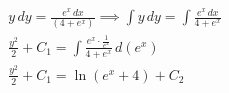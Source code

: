 \documentclass[../rgr_2.tex]{subfiles}
\begin{document}
\Solution

\begin{align}
	y\,dy=\frac{e^x\,dx}{(4+e^x)} \implies
	\int y\,dy=\int \frac{e^x\,dx}{4+e^x} \\
	\frac{y^2}{2}+C_1=\int \frac{e^x\cdot\frac{1}{e^x}}{4+e^x}\,d(e^x) \\
	\frac{y^2}{2}+C_1=\ln\left({e}^{x}+4\right)+C_2
\end{align}

\end{document}
